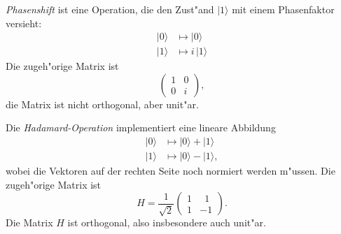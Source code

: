 \begin{beispiel}
{\em Phasenshift} ist eine Operation, die den Zust"and $|1\rangle$ 
mit einem Phasenfaktor versieht:
\begin{align*}
|0\rangle &\mapsto |0\rangle\\
|1\rangle &\mapsto i\,|1\rangle
\end{align*}
Die zugeh"orige Matrix ist
\[
\begin{pmatrix}
1&0\\
0&i
\end{pmatrix},
\]
die Matrix ist nicht orthogonal, aber unit"ar.
\end{beispiel}

\begin{beispiel}
Die {\em Hadamard-Operation} implementiert eine lineare Abbildung
\begin{align*}
|0\rangle &\mapsto |0\rangle + |1\rangle\\
|1\rangle &\mapsto |0\rangle - |1\rangle,
\end{align*}
wobei die Vektoren auf der rechten Seite noch normiert werden m"ussen.
Die zugeh"orige Matrix ist
\[
H=
\frac1{\sqrt{2}}
\begin{pmatrix}
1&\phantom{1}1\\
1&-1
\end{pmatrix}.
\]
Die Matrix $H$ ist orthogonal, also insbesondere auch unit"ar.
\end{beispiel}

